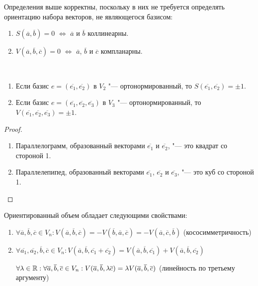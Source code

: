 \begin{note}
	Определения выше корректны, поскольку в них не требуется определять ориентацию набора векторов, не являющегося базисом:
	\begin{enumerate}
		\item $S(\overline{a}, \overline{b}) = 0$ $\Leftrightarrow$ $\overline{a}$ и $\overline{b}$ коллинеарны.
		\item $V(\overline{a}, \overline{b}, \overline{c}) = 0$ $\Leftrightarrow$ $\overline{a}$, $\overline{b}$ и $\overline{c}$ компланарны.
	\end{enumerate}
\end{note}

\begin{proposition}~
	\begin{enumerate}
		\item Если базис $e = (\overline{e_1}, \overline{e_2})$ в $V_2$ "--- ортонормированный, то $S(\overline{e_1}, \overline{e_2}) = \pm 1$.
		\item Если базис $e = (\overline{e_1}, \overline{e_2}, \overline{e_3})$ в $V_3$ "--- ортонормированный, то $V(\overline{e_1}, \overline{e_2}, \overline{e_3}) = \pm 1$.
	\end{enumerate}
\end{proposition}

\begin{proof}~
	\begin{enumerate}
		\item Параллелограмм, образованный векторами $\overline{e_1}$ и $\overline{e_2}$, "--- это квадрат со стороной 1.
		\item Параллелепипед, образованный векторами $\overline{e_1}$, $\overline{e_2}$ и $\overline{e_3}$, "--- это куб со стороной 1.\qedhere
	\end{enumerate}
\end{proof}

\begin{theorem}
	Ориентированный объем обладает следующими свойствами:
	\begin{enumerate}
		\item $\forall \overline{a}, \overline{b}, \overline{c} \in V_n: V(\overline{a}, \overline{b}, \overline{c}) = -V(\overline{b}, \overline{a}, \overline{c}) = -V(\overline{a}, \overline{c}, \overline{b})$ (кососимметричность)
		\item $\forall \overline{a_1}, \overline{a_2}, \overline{b}, \overline{c} \in V_n: V(\overline{a}, \overline{b}, \overline{c_1} + \overline{c_2}) = V(\overline{a}, \overline{b}, \overline{c_1}) + V(\overline{a}, \overline{b}, \overline{c_2})$
		
		$\forall \lambda \in \R: \forall \overline a, \overline b, \overline c \nolinebreak\in\nolinebreak V_n \nolinebreak: \nolinebreak V(\overline{a}, \overline{b}, \lambda\overline{c}) \hm= \lambda V(\overline{a}, \overline{b}, \overline{c})$ (линейность по третьему аргументу)
	\end{enumerate}
\end{theorem}

